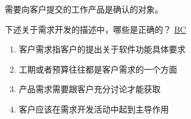 \begin{solution}
需要向客户提交的工作产品是确认的对象。
\end{solution}



\begin{problem}
	下述关于需求开发的描述中，哪些是正确的？
	\uline{BC}    
    \vspace{-0.8em}
    \begin{multicols}{2}
        \begin{enumerate}[label=\Alph*.]
            \item 客户需求指客户的提出关于软件功能具体要求
            \item 工期或者预算往往都是客户需求的一个方面
            \item 产品需求需要跟客户充分讨论才能获取
            \item 客户应该在需求开发活动中起到主导作用
        \end{enumerate}
    \end{multicols}
    \vspace{-1em}
\end{problem}